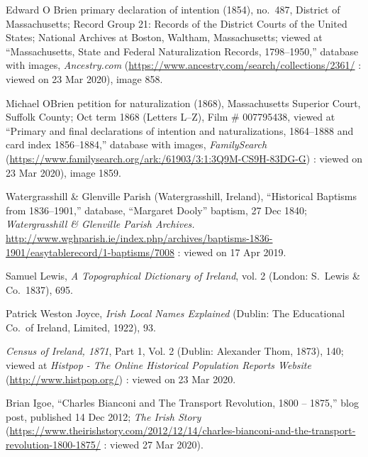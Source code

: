 {{\begin{thebibliography}{999}
	\raggedright
	\small


Edward O Brien primary declaration of intention (1854), no.\ 487, 
District of Massachusetts; 
Record Group 21: Records of the District Courts of the United States; 
National Archives at Boston, Waltham, Massachusetts;
viewed at ``Massachusetts, State and Federal Naturalization Records, 1798--1950,''
database with images, \textit{Ancestry.com} (\url{https://www.ancestry.com/search/collections/2361/} : viewed on 23 Mar 2020), image 858.

Michael OBrien petition for naturalization (1868), 
Massachusetts Superior Court, Suffolk County; 
Oct term 1868 (Letters L--Z), Film \# 007795438,
viewed at ``Primary and final declarations of intention and naturalizations, 1864--1888 and card index 1856--1884,''
database with images, \textit{FamilySearch} (\url{https://www.familysearch.org/ark:/61903/3:1:3Q9M-CS9H-83DG-G}) : viewed on 23 Mar 2020), image 1859.

Watergrasshill \& Glenville Parish (Watergrasshill, Ireland), ``Historical Baptisms from 1836--1901,'' database, ``Margaret Dooly'' baptism, 27 Dec 1840; \textit{Watergrasshill \& Glenville Parish Archives.} \url{http://www.wghparish.ie/index.php/archives/baptisms-1836-1901/easytablerecord/1-baptisms/7008} : viewed on 17 Apr 2019.

Samuel Lewis, \textit{A Topographical Dictionary of Ireland}, vol. 2 (London: S.\ Lewis \& Co.\, 1837), 695.

Patrick Weston Joyce, \textit{Irish Local Names Explained} (Dublin: The Educational Co.\ of Ireland, Limited, 1922), 93.

\textit{Census of Ireland, 1871}, Part 1, Vol. 2 (Dublin: Alexander Thom, 1873), 140; viewed at \textit{Histpop - The Online Historical Population Reports Website} (\url{http://www.histpop.org/}) : viewed on 23 Mar 2020.

Brian Igoe, ``Charles Bianconi and The Transport Revolution, 1800 -- 1875,'' blog post, published 14 Dec 2012; \textit{The Irish Story} (\url{https://www.theirishstory.com/2012/12/14/charles-bianconi-and-the-transport-revolution-1800-1875/} : viewed 27 Mar 2020).


\end{thebibliography}}}
